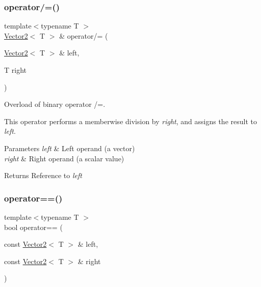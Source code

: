 \subsubsection{\texorpdfstring{operator/=()}{operator/=()}}
{\footnotesize\ttfamily template$<$typename T $>$ \\
\hyperlink{classsf_1_1_vector2}{Vector2}$<$ T $>$ \& operator/= (\begin{DoxyParamCaption}\item[{\hyperlink{classsf_1_1_vector2}{Vector2}$<$ T $>$ \&}]{left,  }\item[{T}]{right }\end{DoxyParamCaption})\hspace{0.3cm}{\ttfamily [related]}}



Overload of binary operator /=. 

This operator performs a memberwise division by {\itshape right}, and assigns the result to {\itshape left}.


\begin{DoxyParams}{Parameters}
{\em left} & Left operand (a vector) \\
\hline
{\em right} & Right operand (a scalar value)\\
\hline
\end{DoxyParams}
\begin{DoxyReturn}{Returns}
Reference to {\itshape left} 
\end{DoxyReturn}
\mbox{\label{classsf_1_1_vector2_a9a7b2d36c3850828fdb651facfd25136}} 
\subsubsection{\texorpdfstring{operator==()}{operator==()}}
{\footnotesize\ttfamily template$<$typename T $>$ \\
bool operator== (\begin{DoxyParamCaption}\item[{const \hyperlink{classsf_1_1_vector2}{Vector2}$<$ T $>$ \&}]{left,  }\item[{const \hyperlink{classsf_1_1_vector2}{Vector2}$<$ T $>$ \&}]{right }\end{DoxyParamCaption})\hspace{0.3cm}{\ttfamily [related]}}



